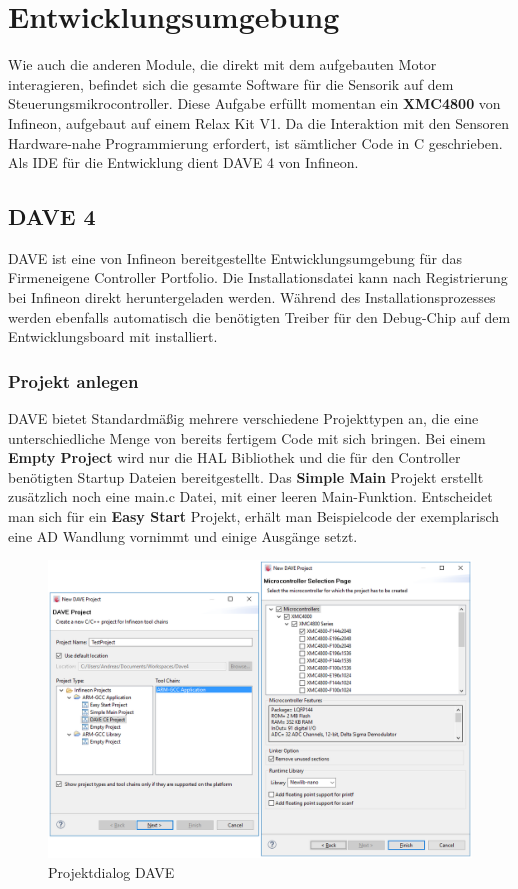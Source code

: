 \section{Entwicklungsumgebung}
Wie auch die anderen Module, die direkt mit dem aufgebauten Motor interagieren, befindet sich die gesamte Software für die Sensorik auf dem Steuerungsmikrocontroller. Diese Aufgabe erfüllt momentan ein \textbf{XMC4800} von Infineon, aufgebaut auf einem Relax Kit V1. Da die Interaktion mit den Sensoren Hardware-nahe Programmierung erfordert, ist sämtlicher Code in C geschrieben. Als IDE für die Entwicklung dient DAVE 4 von Infineon.

\subsection{DAVE 4}
DAVE ist eine von Infineon bereitgestellte Entwicklungsumgebung für das Firmeneigene Controller Portfolio. Die Installationsdatei kann nach Registrierung bei Infineon direkt heruntergeladen werden. Während des Installationsprozesses werden ebenfalls automatisch die benötigten Treiber für den Debug-Chip auf dem Entwicklungsboard mit installiert. \\

\subsubsection{Projekt anlegen} 
DAVE bietet Standardm\"a{\ss}ig mehrere verschiedene Projekttypen an, die eine unterschiedliche Menge von bereits fertigem Code mit sich bringen. Bei einem \textbf{Empty Project} wird nur die HAL Bibliothek und die f\"ur den Controller ben\"otigten Startup Dateien bereitgestellt. Das \textbf{Simple Main} Projekt erstellt zus\"atzlich noch eine main.c Datei, mit einer leeren Main-Funktion. Entscheidet man sich für ein \textbf{Easy Start} Projekt, erh\"alt man Beispielcode der exemplarisch eine AD Wandlung vornimmt und einige Ausg\"ange setzt.

\begin{figure}[ht]
\centering
\includegraphics[width=\textwidth]{sensor/dave_project.PNG}
\caption{Projektdialog DAVE}
\label{img:dave_project}
\end{figure}

